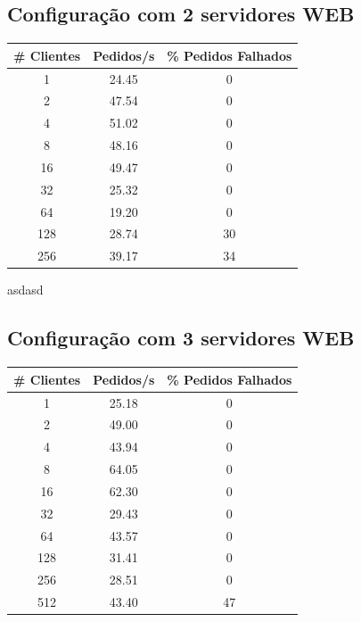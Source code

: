 

\subsection{Configuração com 2 servidores WEB}


\begin{tabular}{|c|c|c|}
\hline
\textbf{\# Clientes} & \textbf{Pedidos/s} & \textbf{\% Pedidos Falhados} \\ \hline
1 & 24.45 & 0 \\ \hline
2 & 47.54 & 0 \\ \hline
4 & 51.02 & 0 \\ \hline
8 & 48.16 & 0 \\ \hline
16 & 49.47 & 0 \\ \hline
32 & 25.32 & 0 \\ \hline
64 & 19.20 & 0 \\ \hline
128 & 28.74 & 30 \\ \hline
256 & 39.17 & 34 \\ \hline
\end{tabular}

asdasd

\subsection{Configuração com 3 servidores WEB}


\begin{tabular}{|c|c|c|}
\hline
\textbf{\# Clientes} & \textbf{Pedidos/s} & \textbf{\% Pedidos Falhados} \\ \hline
1 & 25.18 & 0 \\ \hline
2 & 49.00 & 0 \\ \hline
4 & 43.94 & 0 \\ \hline
8 & 64.05 & 0 \\ \hline
16 & 62.30 & 0 \\ \hline
32 & 29.43 & 0 \\ \hline
64 & 43.57 & 0 \\ \hline
128 & 31.41 & 0 \\ \hline
256 & 28.51 & 0 \\ \hline
512 & 43.40 & 47 \\ \hline
\end{tabular}

